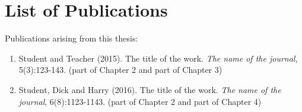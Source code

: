 
\chapter*{List of Publications}

Publications arising from this thesis:

\begin{enumerate}
\item Student and Teacher (2015). The title of the work. {\slshape The name of the journal}, 5(3):123-143. (part of Chapter 2 and part of Chapter 3)
\item Student, Dick and Harry (2016). The title of the work.   {\slshape The name of the journal}, 6(8):1123-1143. (part of Chapter 2 and part of Chapter 4)
\end{enumerate}
